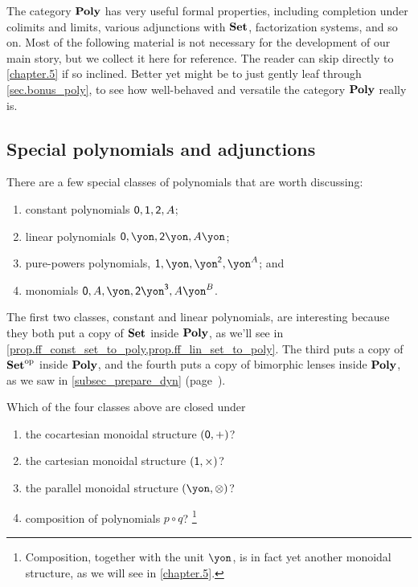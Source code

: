 \documentclass[DynamicalBook]{subfiles}
\begin{document}
The category $\textbf{Poly}$ has very useful formal properties, including completion under colimits and limits, various adjunctions with $\textbf{Set}$, factorization systems, and so on. Most of the following material is not necessary for the development of our main story, but we collect it here for reference. The reader can skip directly to \cref{chapter.5} if so inclined. Better yet might be to just gently leaf through \cref{sec.bonus_poly}, to see how well-behaved and versatile the category $\textbf{Poly}$ really is.

\subsection{Special polynomials and adjunctions}

There are a few special classes of polynomials that are worth discussing: 
\begin{enumerate}
	\item constant polynomials $\textsf{0},\textsf{1},\textsf{2},A$; 
	\item linear polynomials $\0,\yon, \2\yon, A\yon$;
	\item pure-powers polynomials, $\1, \yon, \yon^\2, \yon^A$; and 
	\item monomials $\0, A, \yon, \2\yon^\3, A\yon^B$.
\end{enumerate}
The first two classes, constant and linear polynomials, are interesting because they both put a copy of $\textbf{Set}$ inside $\textbf{Poly}$, as we'll see in \cref{prop.ff_const_set_to_poly,prop.ff_lin_set_to_poly}. The third puts a copy of $\textbf{Set}^{\textnormal{op}}$ inside $\textbf{Poly}$, and the fourth puts a copy of bimorphic lenses inside $\textbf{Poly}$, as we saw in \cref{subsec_prepare_dyn} (page~\pageref{page.bimorphic_lens}).

\begin{exercise}
Which of the four classes above are closed under
\begin{enumerate}
	\item the cocartesian monoidal structure $(\textsf{0},+)$?
	\item the cartesian monoidal structure $(\textsf{1},\times)$?
	\item the parallel monoidal structure $(\yon,\otimes)$?
	\item composition of polynomials $p\circ q$?%
	\footnote{Composition, together with the unit $\yon$, is in fact yet another monoidal structure, as we will see in \cref{chapter.5}.}
\qedhere
\end{enumerate}
\end{exercise}
\end{document}
